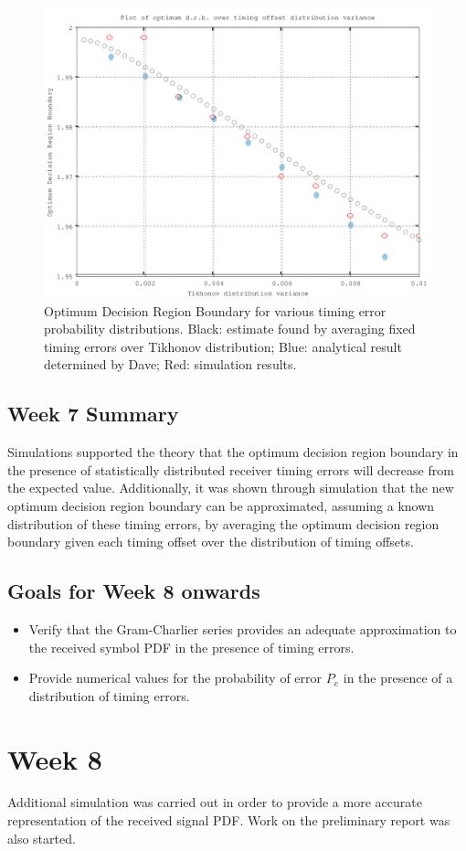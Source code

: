 \begin{figure}[htbp]
\centering
\includegraphics[width=\linewidth]{../../../plots/opt_dec_reg.png}
\caption{Optimum Decision Region Boundary for various timing error
probability distributions. Black: estimate found by averaging fixed timing errors over Tikhonov distribution; Blue: analytical result determined by Dave; Red: simulation results.}
\end{figure}

\subsection{Week 7 Summary}

Simulations supported the theory that the optimum decision region
boundary in the presence of statistically distributed receiver timing
errors will decrease from the expected value. Additionally, it was shown
through simulation that the new optimum decision region boundary can be
approximated, assuming a known distribution of these timing errors, by
averaging the optimum decision region boundary given each timing offset
over the distribution of timing offsets.

\subsection{Goals for Week 8 onwards}

\begin{itemize}
\itemsep1pt\parskip0pt
\item
  Verify that the Gram-Charlier series provides an adequate
  approximation to the received symbol PDF in the presence of timing
  errors.
\item
  Provide numerical values for the probability of error $P_e$ in the
  presence of a distribution of timing errors.
\end{itemize}

\section{Week 8}

Additional simulation was carried out in order to provide a more accurate representation of the received signal PDF. Work on the preliminary report was also started.